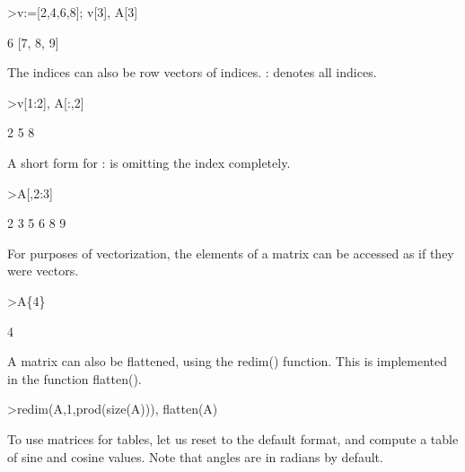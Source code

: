 \documentclass{article}
\begin{document}
\begin{eulernotebook}
\begin{eulercomment}
\begin{eulercomment}
\begin{eulercomment}
\begin{eulercomment}
\begin{eulercomment}
\begin{eulercomment}
\begin{eulerprompt}
>v:=[2,4,6,8]; v[3], A[3]
\end{eulerprompt}
\begin{euleroutput}
  6
  [7,  8,  9]
\end{euleroutput}
\begin{eulercomment}
The indices can also be row vectors of indices. : denotes all indices.
\end{eulercomment}
\begin{eulerprompt}
>v[1:2], A[:,2]
\end{eulerprompt}
\begin{euleroutput}
  [2,  4]
              2 
              5 
              8 
\end{euleroutput}
\begin{eulercomment}
A short form for : is omitting the index completely.
\end{eulercomment}
\begin{eulerprompt}
>A[,2:3]
\end{eulerprompt}
\begin{euleroutput}
              2             3 
              5             6 
              8             9 
\end{euleroutput}
\begin{eulercomment}
For purposes of vectorization, the elements of a matrix can be accessed as if
they were vectors.
\end{eulercomment}
\begin{eulerprompt}
>A\{4\}
\end{eulerprompt}
\begin{euleroutput}
  4
\end{euleroutput}
\begin{eulercomment}
A matrix can also be flattened, using the redim() function. This is
implemented in the function flatten().
\end{eulercomment}
\begin{eulerprompt}
>redim(A,1,prod(size(A))), flatten(A)
\end{eulerprompt}
\begin{euleroutput}
  [1,  2,  3,  4,  5,  6,  7,  8,  9]
  [1,  2,  3,  4,  5,  6,  7,  8,  9]
\end{euleroutput}
\begin{eulercomment}
To use matrices for tables, let us reset to the default format, and
compute a table of sine and cosine values. Note that angles are in
radians by default.
\end{eulercomment}

\end{eulercomment}
\end{eulercomment}
\end{eulercomment}
\end{eulercomment}
\end{eulercomment}
\end{eulercomment}
\end{eulernotebook}
\end{document}
